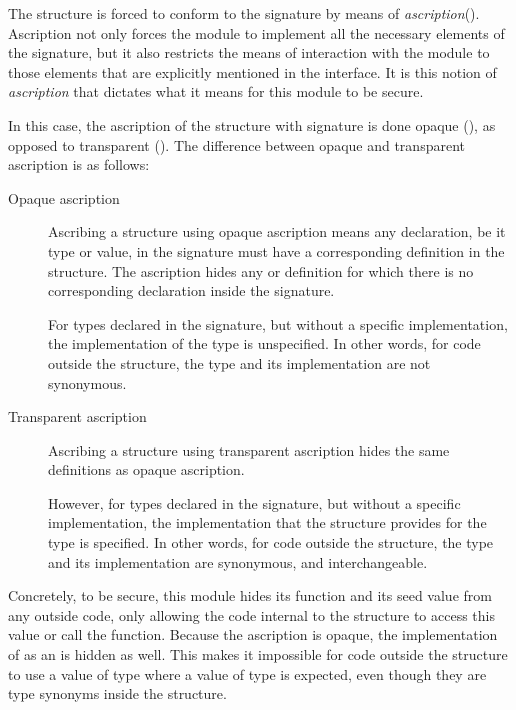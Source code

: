 The  structure is forced to conform to the signature  by means of \emph{ascription}(\lsttext{:>}).
Ascription not only forces the module to implement all the necessary elements of the signature, but it also restricts the means of interaction with the module to those elements that are explicitly mentioned in the interface.
It is this notion of \emph{ascription} that dictates what it means for this module to be secure.

In this case, the ascription of the  structure with signature  is done opaque (\lsttext{:>}), as opposed to transparent (\lsttext{:}).
The difference between opaque and transparent ascription is as follows:
\begin{description}
\item[Opaque ascription] 
Ascribing a structure using opaque ascription \lsttext{:>} means any declaration, be it type or value, in the signature must have a corresponding definition in the structure.
The ascription hides any  or  definition for which there is no corresponding  declaration inside the signature.

For types declared in the signature, but without a specific implementation, the implementation of the type is unspecified.
In other words, for code outside the structure, the type and its implementation are not synonymous.
\item[Transparent ascription] 
Ascribing a structure using transparent ascription \lsttext{:} hides the same definitions as opaque ascription.

However, for types declared in the signature, but without a specific implementation, the implementation that the structure provides for the type is specified.
In other words, for code outside the structure, the type and its implementation are synonymous, and interchangeable.
\end{description}


Concretely, to be secure, this module hides its  function and its seed value from any outside code, only allowing the code internal to the structure to access this value or call the function.
Because the ascription is opaque, the implementation of  as an  is hidden as well.
This makes it impossible for code outside the structure to use a value of type  where a value of type  is expected, even though they are type synonyms inside the  structure.


